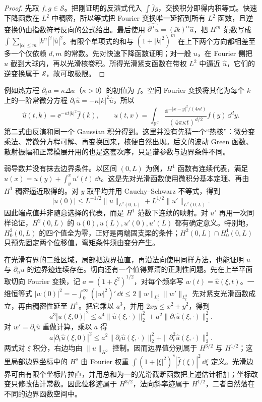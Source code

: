 \begin{proof}
先取 \(f,g\in\mathcal S\)。把刚证明的反演式代入 \(\int\overline f g\)，交换积分即得内积等式。快速下降函数在 \(L^2\) 中稠密，所以等式把 Fourier 变换唯一延拓到所有 \(L^2\) 函数，且逆变换仍由指数符号反向的公式给出。最后使用
\(\widehat{\partial^\alpha u}=(\ii k)^\alpha\widehat u\)，把 \(H^m\) 范数写成
\(\int\sum_{|\alpha|\le m}|k^\alpha|^2|\widehat u|^2\)。有限个单项式的和与 \((1+|k|^2)^m\) 在上下两个方向都相差至多一个仅依赖 \(d,m\) 的常数。先对快速下降函数证明；对一般 \(u\)，在 Fourier 侧把 \(\widehat u\) 截到大球内，再以光滑核卷积。所得光滑紧支函数在带权 \(L^2\) 中逼近 \(\widehat u\)，它们的逆变换属于 \(\mathcal S\)，故可取极限。
\end{proof}

例如热方程 \(\partial_tu=\kappa\Delta u\)（\(\kappa>0\)）的初值为 \(f\)。空间 Fourier 变换将其化为每个 \(k\) 上的一阶常微分方程
\(\partial_t\widehat u=-\kappa|k|^2\widehat u\)，所以
\[
 \widehat u(t,k)=\ee^{-\kappa t|k|^2}\widehat f(k),
 \qquad
 u(t,x)=\int_{\mathbb R^d}
   \frac{\ee^{-|x-y|^2/(4\kappa t)}}{(4\pi\kappa t)^{d/2}}f(y)\,\dd^dy.
\]
第二式由反演和同一个 Gaussian 积分得到。这里并没有先猜一个“热核”：微分变乘法、常微分方程可解、再变换回来，核便自然出现。后文的波动 Green 函数、散射振幅和正常模展开用的也是这套次序，只是谱参数与边界条件不同。

弱导数并没有抹去边界条件。以区间 \((0,L)\) 为例，\(H^1\) 函数有连续代表，满足
\(u(x)=u(y)+\int_y^x u'(t)\,\dd t\)。这是先对光滑函数使用微积分基本定理、再由 \(H^1\) 稠密逼近取得的。对 \(y\) 取平均并用 Cauchy--Schwarz 不等式，得到
\begin{equation}
 |u(0)|\le L^{-1/2}\|u\|_{L^2(0,L)}+L^{1/2}\|u'\|_{L^2(0,L)}.
 \label{eq:advanced-trace-interval}
\end{equation}
因此端点值并非随意选择的代表，而是 \(H^1\) 范数下连续的映射。对 \(u'\) 再用一次同样论证，\(H^2(0,L)\) 的 \(u(0),u(L),u'(0),u'(L)\) 都有确定意义。特别地，\(H_0^2(0,L)\) 的四个值全为零，正好是两端固支梁的条件；\(H^2(0,L)\cap H_0^1(0,L)\) 只预先固定两个位移值，弯矩条件须由变分产生。

在光滑有界的二维区域，局部把边界拉直，再沿法向使用同样方法，也能证明 \(u\) 与 \(\partial_nu\) 的边界迹连续存在。切向还有一个值得算清的正则性问题。先在上半平面取切向 Fourier 变换，记 \(a=(1+\xi^2)^{1/2}\)，对每个频率写 \(w(t)=\widehat u(\xi,t)\)。一维恒等式
\(
 |w(0)|^2=-\int_0^\infty (|w|^2)'\,\dd t
 \le 2\|w\|_{L^2_t}\|w'\|_{L^2_t}
\)
先对紧支光滑函数成立，再由稠密性延至 \(H^1\)。把它乘以 \(a^3\)，并用 \(2xy\le x^2+y^2\)，得到
\[
 a^3|\widehat u(\xi,0)|^2
 \le a^4\|\widehat u(\xi,\cdot)\|_2^2
    +a^2\|\partial_t\widehat u(\xi,\cdot)\|_2^2.
\]
对 \(w'=\partial_t\widehat u\) 重做计算，乘以 \(a\) 得
\[
 a|\partial_t\widehat u(\xi,0)|^2
 \le a^2\|\partial_t\widehat u(\xi,\cdot)\|_2^2
    +\|\partial_t^2\widehat u(\xi,\cdot)\|_2^2.
\]
两式对 \(\xi\) 积分，右边均由 \(\|u\|_{H^2}\) 控制。因而边界值分别属于 \(H^{3/2}\) 与 \(H^{1/2}\)；这里局部边界坐标中的 \(H^s\) 由 Fourier 权重
\(\int(1+|\xi|^2)^s|\widehat f(\xi)|^2\,\dd\xi\)
定义。光滑边界可由有限个坐标片拉直，并用总和为一的光滑截断函数把上述估计相加；坐标改变只修改估计常数。因此位移迹属于 $H^{3/2}$，法向斜率迹属于 $H^{1/2}$，二者自然落在不同的边界函数空间中。

